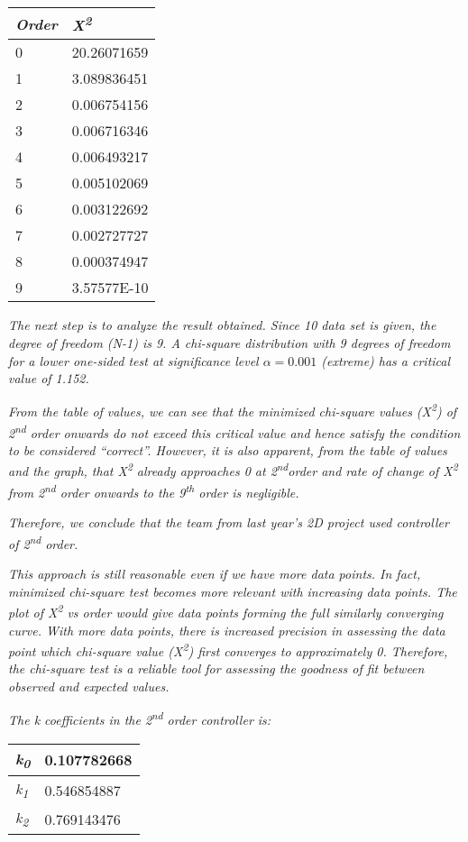 \documentclass[]{article}
\begin{document}
\begin{longtable}[]{@{}ll@{}}
\toprule
\emph{Order} & \emph{X\textsuperscript{2}}\tabularnewline
\midrule
\endhead
0 & 20.26071659\tabularnewline
1 & 3.089836451\tabularnewline
2 & 0.006754156\tabularnewline
3 & 0.006716346\tabularnewline
4 & 0.006493217\tabularnewline
5 & 0.005102069\tabularnewline
6 & 0.003122692\tabularnewline
7 & 0.002727727\tabularnewline
8 & 0.000374947\tabularnewline
9 & 3.57577E-10\tabularnewline
\bottomrule
\end{longtable}

\emph{The next step is to analyze the result obtained. Since 10 data set
is given, the degree of freedom (N-1) is 9. A chi-square distribution
with 9 degrees of freedom for a lower one-sided test at significance
level $\alpha = 0.001$ (extreme) has a critical value of 1.152.}

\emph{From the table of values, we can see that the minimized chi-square
values (X\textsuperscript{2}) of 2\textsuperscript{nd} order onwards do
not exceed this critical value and hence satisfy the condition to be
considered ``correct''. However, it is also apparent, from the table of
values and the graph, that X\textsuperscript{2} already approaches 0 at
2\textsuperscript{nd}order and rate of change of X\textsuperscript{2}
from 2\textsuperscript{nd} order onwards to the 9\textsuperscript{th}
order is negligible. }

\emph{Therefore, we conclude that the team from last year's 2D project
used controller of 2\textsuperscript{nd} order.}

\emph{This approach is still reasonable even if we have more data
points. In fact, minimized chi-square test becomes more relevant with
increasing data points. The plot of X\textsuperscript{2} vs order would
give data points forming the full similarly converging curve. With more
data points, there is increased precision in assessing the data point
which chi-square value (X\textsuperscript{2}) first converges to
approximately 0. Therefore, the chi-square test is a reliable tool for
assessing the goodness of fit between observed and expected values.}

\emph{The k coefficients in the 2\textsuperscript{nd} order controller
is:}

\begin{longtable}[]{@{}ll@{}}
\toprule
\emph{k\textsubscript{0}} & 0.107782668\tabularnewline
\midrule
\endhead
\emph{k\textsubscript{1}} & 0.546854887\tabularnewline
\emph{k\textsubscript{2}} & 0.769143476\tabularnewline
\bottomrule
\end{longtable}
\end{document}

